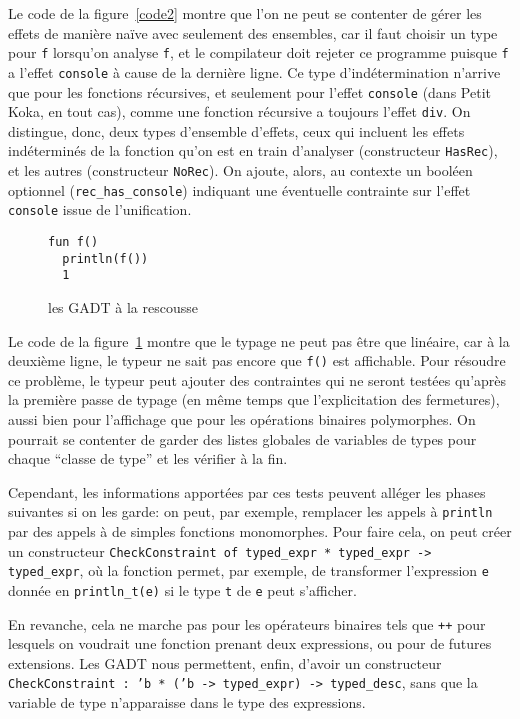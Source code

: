 \documentclass[11pt]{article}
\begin{document}
Le code de la figure~\ref{code2} montre que l'on ne peut se contenter de gérer
les effets de manière naïve avec seulement des ensembles, car il faut choisir un
type pour \texttt{f} lorsqu'on analyse \texttt{f}, et le compilateur doit
rejeter ce programme puisque \texttt{f} a l'effet \texttt{console} à cause de la
dernière ligne. Ce type d'indétermination n'arrive que pour les fonctions
récursives, et seulement pour l'effet \texttt{console} (dans \textsf{Petit
  Koka}, en tout cas), comme une fonction récursive a toujours l'effet
\texttt{div}. On distingue, donc, deux types d'ensemble d'effets, ceux qui
incluent les effets indéterminés de la fonction qu'on est en train d'analyser
(constructeur \texttt{HasRec}), et les autres (constructeur \texttt{NoRec}). On
ajoute, alors, au contexte un booléen optionnel (\texttt{rec\_has\_console})
indiquant une éventuelle contrainte sur l'effet \texttt{console} issue de
l'unification.

\begin{figure}[h]
\begin{verbatim}
fun f()
  println(f())
  1
\end{verbatim}
\caption{les GADT à la rescousse}\label{code1}
\end{figure}

Le code de la figure~\ref{code1} montre que le typage ne peut pas être que
linéaire, car à la deuxième ligne, le typeur ne sait pas encore que \texttt{f()}
est affichable. Pour résoudre ce problème, le typeur peut ajouter des
contraintes qui ne seront testées qu'après la première passe de typage (en même
temps que l'explicitation des fermetures), aussi bien pour l'affichage que pour
les opérations binaires polymorphes. On pourrait se contenter de garder des
listes globales de variables de types pour chaque ``classe de type'' et les
vérifier à la fin.

Cependant, les informations apportées par ces tests peuvent alléger les phases
suivantes si on les garde: on peut, par exemple, remplacer les appels à
\texttt{println} par des appels à de simples fonctions monomorphes. Pour faire
cela, on peut créer un constructeur \texttt{CheckConstraint of typed\_expr *
  typed\_expr -> typed\_expr}, où la fonction permet, par exemple, de
transformer l'expression \texttt{e} donnée en \texttt{println\_t(e)} si le type
\texttt{t} de \texttt{e} peut s'afficher.

En revanche, cela ne marche pas pour les opérateurs binaires tels que
\texttt{++} pour lesquels on voudrait une fonction prenant deux expressions, ou
pour de futures extensions. Les GADT nous permettent, enfin, d'avoir un
constructeur \texttt{\texttt{CheckConstraint : 'b * ('b -> typed\_expr) ->
    typed\_desc}}, sans que la variable de type n'apparaisse dans le type des
expressions.
\end{document}
